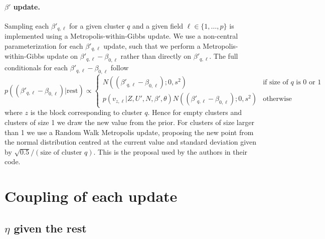 \documentclass[ba]{imsart}
\begin{document}
\paragraph{$\beta'$ update.} Sampling each $\beta'_{q, \ell}$ for a given cluster $q$ and a given field $\ell \in \{ 1, \ldots, p \} $ is implemented using a Metropolis-within-Gibbs update. We use a non-central parameterization for each $\beta'_{q, \ell}$ update, such that we perform a Metropolis-within-Gibbs update on $\beta'_{q,\ell} - \beta_{0,\ell}$ rather than directly on $\beta'_{q,\ell}$. The full conditionals for each $\beta'_{q,\ell} - \beta_{0,\ell}$ follow
$$ p\left( (\beta'_{q,\ell} - \beta_{0,\ell}) |\text{rest}\right) \propto \left\{\begin{matrix}
N((\beta'_{q,\ell} - \beta_{0,\ell}) ; 0, s^2) & \text{if size of $q$ is 0 or 1}\\ 
p(v_{z,\ell}|Z, U', N, \beta', \theta) N((\beta'_{q,\ell} - \beta_{0,\ell}); 0, s^2) & \text{otherwise}
\end{matrix}\right. $$
where $z$ is the block corresponding to cluster $q$. Hence for empty clusters and clusters of size 1 we draw the new value from the prior. For clusters of size larger than 1 we use a Random Walk Metropolis update, proposing the new point from the normal distribution centred at the current value and standard deviation given by
$\sqrt{0.5}/(\text{size of cluster }q)$. This is the proposal used by the authors in their code.

\begin{comment}
As for the update of $\beta'_{q,\ell}$ for a given cluster $q$ and variable $\ell$ we can implement a Metropolis-within-Gibbs update,
with the target defined as the product of the term $N(\beta_{0,\ell}, s^2)$
coming from the prior and the likelihood term $p(v_{z,\ell}|Z, U', N, \beta', \theta)$, where $z$ is the block corresponding to label $q$. We can employ a Normal proposal as $\beta'_{q,\ell}$ is in $\mathbb{R}$.
\end{comment}



\section{Coupling of each update}

\subsection{\texorpdfstring{$\eta$}{eta} given the rest}
\end{document}
